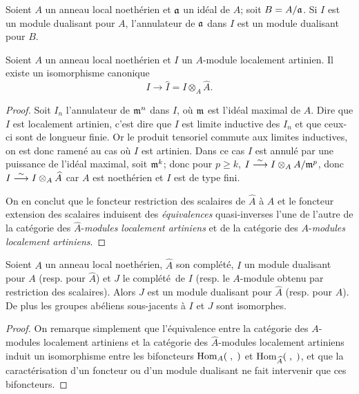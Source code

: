 \begin{corollaire} \label{IV.4.4} Soient $A$ un anneau local noeth\'erien et $\mathfrak{a}$ un id\'eal de $A$; soit $B=A/\mathfrak{a}$. Si $I$ est un module dualisant pour $A$, l'annulateur de $\mathfrak{a}$ dans $I$ est un module dualisant pour $B$.
\end{corollaire}

\begin{lemme} \label{IV.4.5} Soient $A$ un anneau local noeth\'erien et $I$ un $A$-module localement artinien. Il existe un isomorphisme canonique
$$
I\to \hat{I}=I\otimes_{A}\hat{A}.
$$
\end{lemme}

\begin{proof}
Soit $I_{n}$ l'annulateur de $\mathfrak{m}^n$ dans $I$, o\`u $\mathfrak{m}$ est l'id\'eal maximal de $A$. Dire que $I$ est localement artinien, c'est dire que $I$ est limite inductive des $I_{n}$ et que ceux-ci sont de longueur finie. Or le produit tensoriel commute aux limites inductives, on est donc ramen\'e au cas o\`u $I$ est artinien. Dans ce cas $I$ est annul\'e par une puissance de l'id\'eal maximal, soit $\mathfrak{m}^{k}$; donc pour $p\geq k$, $I\overset{\sim}{\longrightarrow} I\otimes_{A}A/\mathfrak{m}^{p}$, donc $I\overset{\sim}{\longrightarrow} I\otimes_{A}\widehat{A}$ car $A$ est noeth\'erien et $I$ est de type fini.

On en conclut que le foncteur restriction des scalaires de $\hat{A}$ \`a $A$ et le foncteur extension des scalaires induisent des \emph{équivalences} quasi-inverses l'une de l'autre de la cat\'egorie des $\hat{A}$-\emph{modules localement artiniens} et de la cat\'egorie des $A$-\emph{modules localement artiniens}.
\skipqed
\end{proof}

\begin{proposition} \label{IV.4.6}
Soient $A$ un anneau local noeth\'erien, $\hat{A}$ son compl\'et\'e, $I$ un module dualisant pour $A$ (resp. pour $\hat{A}$) et $J$ le compl\'et\'e\, de $I$ (resp. le $A$-module obtenu par restriction des scalaires). Alors $J$ est un module dualisant pour $\hat{A}$ (resp. pour $A$). De plus les groupes ab\'eliens sous-jacents \`a $I$ et $J$ sont isomorphes.
\end{proposition}

\begin{proof}
On remarque simplement que l'\'equivalence entre la cat\'egorie des $A$-modules localement artiniens et la cat\'egorie des $\hat{A}$-modules localement artiniens induit un isomorphisme entre les bifoncteurs $\operatorname{Hom}_{A}(\;, \;)$ et $\operatorname{Hom}_{\widehat{A}}(\;, \;)$, et que la caract\'erisation d'un foncteur ou d'un module dualisant ne fait intervenir que ces bifoncteurs.
\skipqed
\end{proof}

